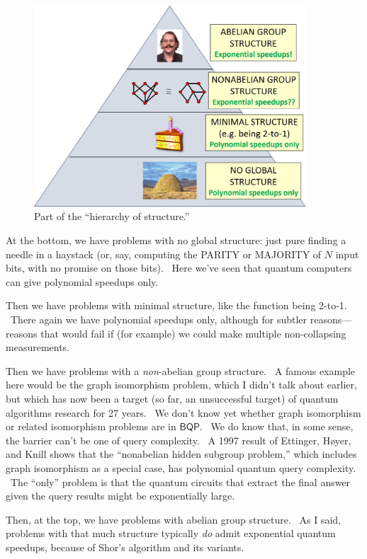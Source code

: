 \documentclass[12pt]{article}
\begin{document}
\begin{figure}
\centering
\includegraphics[width=4in]{hierarchy.jpg}
\caption{Part of the ``hierarchy of structure.''}
\label{hierarchy}
\end{figure}

At the bottom, we have problems with no global structure: just pure finding a needle in a haystack (or, say, computing the PARITY or MAJORITY of $N$ input bits, with no promise on those bits). \ Here we've seen that quantum computers can give polynomial speedups only.

Then we have problems with minimal structure, like the function being 2-to-1. \ There again we have polynomial speedups only, although for subtler reasons---reasons that would fail if (for example) we could make multiple non-collapsing measurements.

Then we have problems with a \emph{non}-abelian group structure. \ A famous example here would be the graph isomorphism problem, which I didn't talk about earlier, but which has now been a target (so far, an unsuccessful target) of quantum algorithms research for 27 years. \ We don't know yet whether graph isomorphism or related isomorphism problems are in $\mathsf{BQP}$. \ We do know that, in some sense, the barrier can't be one of query complexity. \ A 1997 result of Ettinger, H{\o}yer, and Knill \cite{ehk} shows that the ``nonabelian hidden subgroup problem,'' which includes graph isomorphism as a special case, has polynomial quantum query complexity. \ The ``only'' problem is that the quantum circuits that extract the final answer given the query results might be exponentially large.

Then, at the top, we have problems with abelian group structure. \ As I said, problems with that much structure typically \emph{do} admit exponential quantum speedups, because of Shor's algorithm and its variants.
\end{document}
